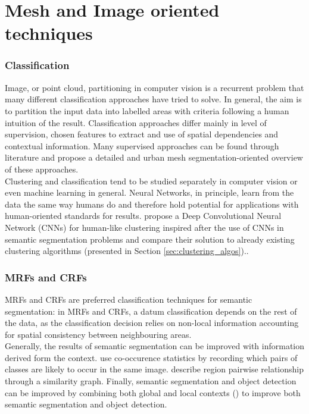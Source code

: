 \documentclass{kththesis}
\begin{document}
\section{Mesh and Image oriented techniques}
\subsubsection{Classification}
Image, or point cloud, partitioning in computer vision is a recurrent problem that many different classification approaches have tried to solve. In general, the aim is to partition the input data into labelled areas with criteria following a human intuition of the result. Classification approaches differ mainly in level of supervision, chosen features to extract and  use of
spatial dependencies and contextual information.  Many supervised approaches can be found through literature and \textcite{rouhani} propose a detailed and urban mesh segmentation-oriented overview of these approaches.  \\
Clustering and classification tend to be studied separately in computer vision or even machine learning in general. Neural Networks, in principle, learn from the data the same way humans do and therefore hold potential for applications with  human-oriented standards for results.  \textcite{ClusteringTechniques} propose a Deep Convolutional Neural Network (CNNs) for human-like clustering inspired after the use of CNNs in semantic segmentation problems and compare their solution to already existing clustering algorithms (presented in Section \ref{sec:clustering_algos}).. 

\subsubsection{ MRFs and CRFs}
MRFs and CRFs are preferred classification techniques for  semantic segmentation: in MRFs and CRFs, a datum classification depends on the rest of the data, as the classification decision relies on non-local information accounting for spatial consistency between neighbouring areas.  \\
Generally, the results of semantic segmentation can be improved with information derived form the context.  \textcite{Ladicky:2013:IMC:2503179.2503202} use co-occurence statistics by recording which pairs of classes are likely to occur in the same image. 
\textcite{Myeong2012} describe region pairwise relationship through a similarity graph. Finally, semantic segmentation and object detection can be improved by combining both global and local contexts 
(\textcite{Mottaghi2014}) to improve both semantic segmentation and object
detection.  
\end{document}
